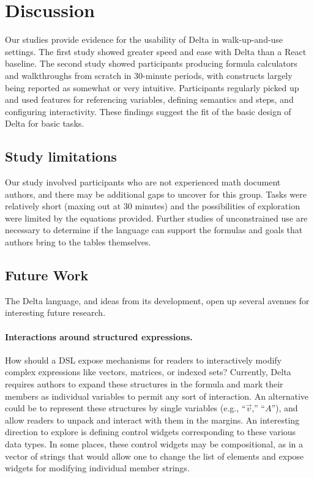 \section{Discussion}

Our studies provide evidence for the usability of Delta in walk-up-and-use settings. The first study showed greater speed and ease with Delta than a React baseline. The second study showed participants producing formula calculators and walkthroughs from scratch in 30-minute periods, with constructs largely being reported as somewhat or very intuitive. Participants regularly picked up and used features for referencing variables, defining semantics and steps, and configuring interactivity. These findings suggest the fit of the basic design of Delta for basic tasks.

\subsection{Study limitations}

Our study involved participants who are not experienced math document authors, and there may be additional gaps to uncover for this group. Tasks were relatively short (maxing out at 30 minutes) and the possibilities of exploration were limited by the equations provided. Further studies of unconstrained use are necessary to determine if the language can support the formulas and goals that authors bring to the tables themselves.

\subsection{Future Work}

The Delta language, and ideas from its development, open up several avenues for interesting future research.

\paragraph{Interactions around structured expressions.}
How should a DSL expose mechanisms for readers to interactively modify complex expressions like vectors, matrices, or indexed sets? Currently, Delta requires authors to expand these structures in the formula and mark their members as individual variables to permit any sort of interaction. An alternative could be to represent these structures by single variables (e.g., ``$\vec{v}$,'' ``$A$''), and allow readers to unpack and interact with them in the margins. An interesting direction to explore is defining control widgets corresponding to these various data types. In some places, these control widgets may be compositional, as in a vector of strings that would allow one to change the list of elements and expose widgets for modifying individual member strings.

